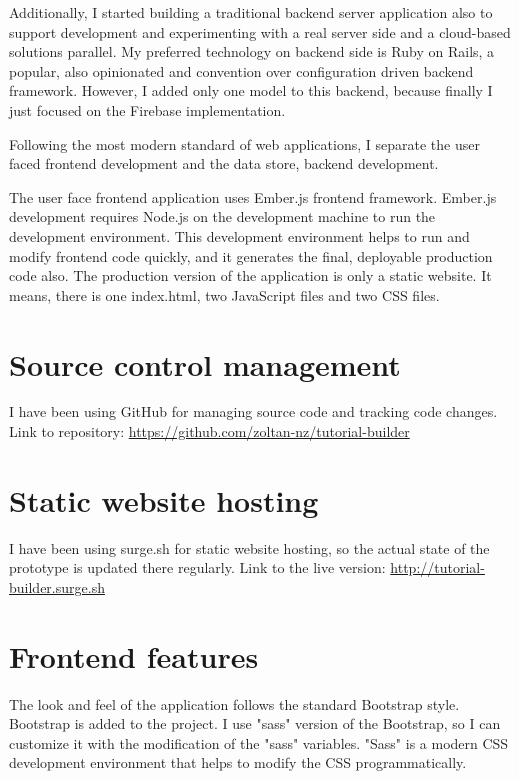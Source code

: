 \documentclass[11pt, a4paper, oneside, openright, medskipamount]{report}
\begin{document}
Additionally, I started building a traditional backend server application also to support development and experimenting with a real server side and a cloud-based solutions parallel. My preferred technology on backend side is Ruby on Rails, a popular, also opinionated and convention over configuration driven backend framework. However, I added only one model to this backend, because finally I just focused on the Firebase implementation.

Following the most modern standard of web applications, I separate the user faced frontend development and the data store, backend development.

The user face frontend application uses Ember.js frontend framework. Ember.js development requires Node.js on the development machine to run the development environment. This development environment helps to run and modify frontend code quickly, and it generates the final, deployable production code also. The production version of the application is only a static website. It means, there is one index.html, two JavaScript files and two CSS files.

\section{Source control management}

I have been using GitHub for managing source code and tracking code changes. Link to repository: \url{https://github.com/zoltan-nz/tutorial-builder}

\section{Static website hosting}

I have been using surge.sh \cite{surge} for static website hosting, so the actual state of the prototype is updated there regularly. Link to the live version: \url{http://tutorial-builder.surge.sh}

\section{Frontend features}

The look and feel of the application follows the standard Bootstrap style. Bootstrap is added to the project. I use "sass" version of the Bootstrap, so I can customize it with the modification of the "sass" variables. "Sass" is a modern CSS development environment that helps to modify the CSS programmatically.
\end{document}
